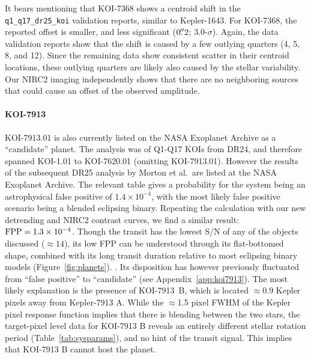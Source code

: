 \documentclass[12pt,twocolumn,tighten,linenumbers,trackchanges]{aastex63}
\begin{document}
It bears mentioning that KOI-7368 shows a centroid shift in the
\texttt{q1\_q17\_dr25\_koi} validation reports, similar to
Kepler-1643.  For KOI-7368, the reported offset is smaller, and less
significant ($0\mbox{$.\!\!^{\prime\prime}$}2$; 3.0-$\sigma$).  Again, the data
validation reports show that the shift is caused by a few outlying
quarters (4, 5, 8, and 12).  Since the remaining data show
consistent scatter in their centroid locations, these
outlying quarters are likely also caused by the stellar variability.  
Our NIRC2 imaging independently shows that there are no neighboring
sources that could cause an offset of the observed amplitude.

\paragraph{KOI-7913}
KOI-7913.01 is also currently listed on the NASA Exoplanet Archive as a
``candidate'' planet.  The \citet{morton_false_2016}
analysis was of Q1-Q17 KOIs from DR24, and therefore spanned KOI-1.01
to KOI-7620.01 (omitting KOI-7913.01).  However the results of the
subsequent DR25 analysis by Morton et al.\ are listed at the NASA
Exoplanet Archive.  The relevant table gives a probability for the
system being an astrophysical false positive of $1.4\times10^{-4}$,
with the most likely false positive scenario being a blended eclipsing
binary.  Repeating the calculation with our new detrending and
NIRC2 contrast curves, we find a similar result: ${\rm FPP} =
1.3\times10^{-4}$.  Though the transit has the lowest S/N of any of
the objects discussed ($\approx$$14$), its low FPP  can be understood through its flat-bottomed shape,
combined with its long transit duration relative to most
eclipsing binary models (Figure~\ref{fig:planets}).  .  Its
disposition has however previously fluctuated from ``false positive''
to ``candidate'' (see Appendix~\ref{app:koi7913}).  The most likely
explanation is the presence of KOI-7913~B, which is located
$\approx0.9$ Kepler pixels away from Kepler-7913 A.  
While the $\approx$1.5 pixel FWHM of the Kepler pixel response function
implies that there is blending between the two stars,
the target-pixel level data for KOI-7913 B reveals an
entirely different stellar rotation
period (Table~\ref{tab:sysparams}), and no hint of the transit signal.
This implies that KOI-7913 B cannot host the planet.
\end{document}
